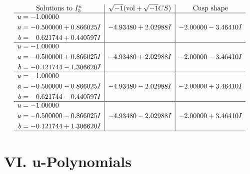 \documentclass[1p]{elsarticle_modified}
\theoremstyle{definition}
\newcommand{\I}{\sqrt{-1}}
\begin{document}
$$\begin{array}{c|c|c}  
\text{Solutions to }I^u_{5}& \I (\text{vol} + \sqrt{-1}CS) & \text{Cusp shape}\\
 \hline 
\begin{aligned}
u &= -1.00000\phantom{ +0.000000I} \\
a &= -0.500000 + 0.866025 I \\
b &= \phantom{-}0.621744 + 0.440597 I\end{aligned}
 & -4.93480 + 2.02988 I & -2.00000 - 3.46410 I \\ \hline\begin{aligned}
u &= -1.00000\phantom{ +0.000000I} \\
a &= -0.500000 + 0.866025 I \\
b &= -0.121744 - 1.306620 I\end{aligned}
 & -4.93480 + 2.02988 I & -2.00000 - 3.46410 I \\ \hline\begin{aligned}
u &= -1.00000\phantom{ +0.000000I} \\
a &= -0.500000 - 0.866025 I \\
b &= \phantom{-}0.621744 - 0.440597 I\end{aligned}
 & -4.93480 - 2.02988 I & -2.00000 + 3.46410 I \\ \hline\begin{aligned}
u &= -1.00000\phantom{ +0.000000I} \\
a &= -0.500000 - 0.866025 I \\
b &= -0.121744 + 1.306620 I\end{aligned}
 & -4.93480 - 2.02988 I & -2.00000 + 3.46410 I\\
 \hline 
 \end{array}$$\newpage
\newpage\renewcommand{\arraystretch}{1}
\centering \section*{ VI. u-Polynomials}
\end{document}
